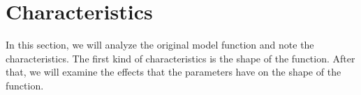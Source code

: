 \section{Characteristics}
\label{sec:setup.char}

In this section, we will analyze the original model function and note the characteristics.
The first kind of characteristics is the shape of the function.
After that, we will examine the effects that the parameters have on the shape of the function.



